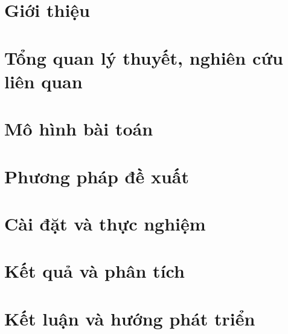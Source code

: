 \documentclass{template/thesis}
\begin{document}
\firstbeforepreface
\secondbeforepreface
\afterpreface

\chapter{Giới thiệu}
\label{c:intro}


\chapter{Tổng quan lý thuyết, nghiên cứu liên quan}
\label{c:cosolythuyet}



\chapter{Mô hình bài toán}
\label{c:mohinhbaitoan}


\chapter{Phương pháp đề xuất}
\label{c:phuongphapdexuat}


\chapter{Cài đặt và thực nghiệm}
\label{c:caidatvathucnghiem}


\chapter{Kết quả và phân tích}
\label{c:ketquavaphantich}


\chapter{Kết luận và hướng phát triển}
\label{c:ketluanvahuongphattrien}


\begingroup
\setlength{\emergencystretch}{8em}
\justifying\printbibliography[title=Tài liệu tham khảo]
\endgroup
{}
\end{document}
